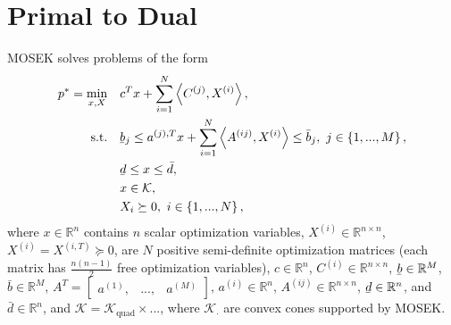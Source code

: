 \documentclass{article}
\newcommand{\setdef}[2][]{
	\left\{
	\ifblank{#1}{}{#1 \hspace{.1cm} \middle| \hspace{.1cm}}
	#2
	\right\}
}
\newcommand{\var}[2]{{#1}_{\mathrm{#2}}}
\newcommand{\set}[1]{\mathcal{#1}}
\newcommand{\trace}[1]{\left\langle #1\right\rangle}
\newcommand{\ubar}[1]{\underaccent{\bar}{#1}}
\begin{document}
	\section{Primal to Dual}
	MOSEK solves problems of the form
	\begin{subequations}\label{eqs:SDP_primal}
		\begin{align}
			p^* = \min_{x,X}\quad	&c^Tx + \sum_{i=1}^{N} \trace{C^{(j)},X^{(i)}},\\
			\text{s.t.}\quad&\ubar{b}_j \leq a^{(j),T}x+\sum_{i=1}^{N}\trace{A^{(ij)},X^{(i)}} \leq \bar{b}_j, \ j\in\setdef{1,...,M},\label{eq:ineq_primal}\\
			&\ubar{d} \leq x \leq \bar{d},\\
			&x \in \set{K},\\
			&X_i \succeq 0, \ i\in\setdef{1,...,N},
		\end{align}
	\end{subequations}
	where $x\in\mathbb{R}^n$ contains $n$ scalar optimization variables, $X^{(i)}\in\mathbb{R}^{n\times n}$, $X^{(i)} = X^{(i,T)}\succeq 0$, are $N$ positive semi-definite optimization matrices (each matrix has $\frac{n (n-1)}{2}$ free optimization variables), $c\in\mathbb{R}^n$, $C^{(i)}\in\mathbb{R}^{n\times n}$, $\ubar{b}\in\mathbb{R}^{M}$, $\bar{b}\in\mathbb{R}^{M}$, $A^T = \begin{bmatrix}a^{(1)},&...,&a^{(M)}\end{bmatrix}$, $a^{(i)}\in\mathbb{R}^{n}$, $A^{(ij)}\in\mathbb{R}^{n\times n}$, $\ubar{d}\in\mathbb{R}^{n}$, and $\bar{d}\in\mathbb{R}^n$, and $\set{K} = \var{\set{K}}{quad}\times ...$, where $\var{\set{K}}{\cdot}$ are convex cones supported by MOSEK.
	
\end{document}
